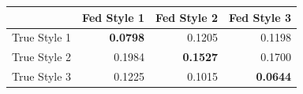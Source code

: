 \begin{tabular}{lrrr}
\toprule
 & Fed Style 1 & Fed Style 2 & Fed Style 3 \\
\midrule
True Style 1 & \textbf{0.0798} & 0.1205 & 0.1198 \\
True Style 2 & 0.1984 & \textbf{0.1527} & 0.1700 \\
True Style 3 & 0.1225 & 0.1015 & \textbf{0.0644} \\
\bottomrule
\end{tabular}
